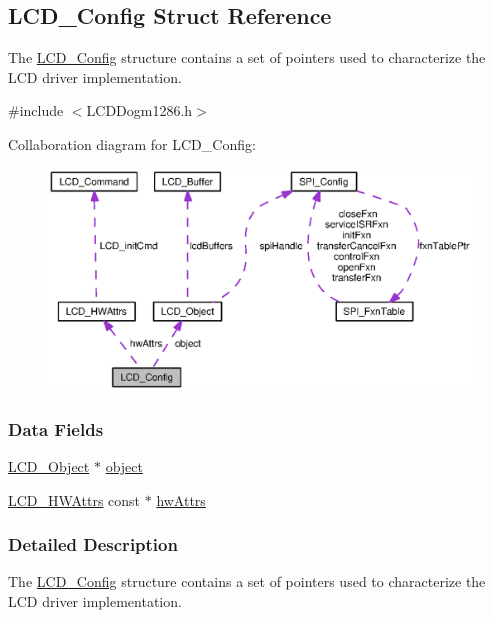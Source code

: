 \subsection{L\+C\+D\+\_\+\+Config Struct Reference}
\label{struct_l_c_d___config}


The \hyperlink{struct_l_c_d___config}{L\+C\+D\+\_\+\+Config} structure contains a set of pointers used to characterize the L\+C\+D driver implementation.  




{\ttfamily \#include $<$L\+C\+D\+Dogm1286.\+h$>$}



Collaboration diagram for L\+C\+D\+\_\+\+Config\+:
\nopagebreak
\begin{figure}[H]
\begin{center}
\leavevmode
\includegraphics[width=350pt]{struct_l_c_d___config__coll__graph}
\end{center}
\end{figure}
\subsubsection*{Data Fields}
\begin{DoxyCompactItemize}
\item 
\hyperlink{struct_l_c_d___object}{L\+C\+D\+\_\+\+Object} $\ast$ \hyperlink{struct_l_c_d___config_a264b39a3788c4e64089320afa5ad33fc}{object}
\item 
\hyperlink{struct_l_c_d___h_w_attrs}{L\+C\+D\+\_\+\+H\+W\+Attrs} const $\ast$ \hyperlink{struct_l_c_d___config_a76942612562659fe3b3254b24c66f2b9}{hw\+Attrs}
\end{DoxyCompactItemize}


\subsubsection{Detailed Description}
The \hyperlink{struct_l_c_d___config}{L\+C\+D\+\_\+\+Config} structure contains a set of pointers used to characterize the L\+C\+D driver implementation. 

